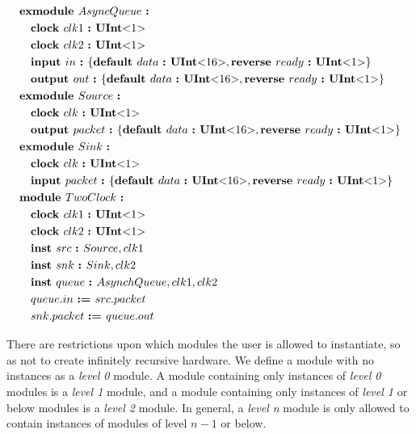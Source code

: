 \documentclass[12pt]{article}
\begin{document}
{\footnotesize
\[
\begin{aligned}
&\kw{exmodule} AsyncQueue \ \kws{:} \\
&\quad \kw{clock} clk1 \ \kw{:} \kws{UInt$<$} 1 \kws{$>$} \\
&\quad \kw{clock} clk2 \ \kw{:} \kws{UInt$<$} 1 \kws{$>$} \\
&\quad \kw{input} in  \ \kw{:} \bundleT{\kw{default} data \ \kw{:} \kws{UInt$<$}16\kws{$>$},\kw{reverse} ready \ \kw{:} \kws{UInt$<$}1\kws{$>$}} \\
&\quad \kw{output} out  \ \kw{:} \bundleT{\kw{default} data \ \kw{:} \kws{UInt$<$}16\kws{$>$},\kw{reverse} ready \ \kw{:} \kws{UInt$<$}1\kws{$>$}} \\
&\kw{exmodule} Source \ \kws{:} \\
&\quad \kw{clock} clk \ \kw{:} \kws{UInt$<$} 1 \kws{$>$} \\
&\quad \kw{output} packet  \ \kw{:} \bundleT{\kw{default} data \ \kw{:} \kws{UInt$<$}16\kws{$>$},\kw{reverse} ready \ \kw{:} \kws{UInt$<$}1\kws{$>$}} \\
&\kw{exmodule} Sink \ \kws{:} \\
&\quad \kw{clock} clk \ \kw{:} \kws{UInt$<$} 1 \kws{$>$} \\
&\quad \kw{input} packet  \ \kw{:} \bundleT{\kw{default} data \ \kw{:} \kws{UInt$<$}16\kws{$>$},\kw{reverse} ready \ \kw{:} \kws{UInt$<$}1\kws{$>$}} \\
&\kw{module} TwoClock \ \kws{:} \\
&\quad \kw{clock} clk1 \ \kw{:} \kws{UInt$<$} 1 \kws{$>$} \\
&\quad \kw{clock} clk2 \ \kw{:} \kws{UInt$<$} 1 \kws{$>$} \\
&\quad \kw{inst} src \ \kw{:} Source, clk1 \\
&\quad \kw{inst} snk \ \kw{:} Sink, clk2 \\
&\quad \kw{inst} queue \ \kw{:} AsynchQueue, clk1, clk2 \\
&\quad queue.in \ \kw{:=} src.packet \\
&\quad snk.packet \ \kw{:=} queue.out \\
\end{aligned}
\]
}

There are restrictions upon which modules the user is allowed to instantiate, so as not to create infinitely recursive hardware.
We define a module with no instances as a {\em level 0} module.
A module containing only instances of {\em level 0} modules is a {\em level 1} module, and a module containing only instances of {\em level 1} or below modules is a {\em level 2} module.
In general, a {\em level n} module is only allowed to contain instances of modules of level $n-1$ or below. 
\end{document}
